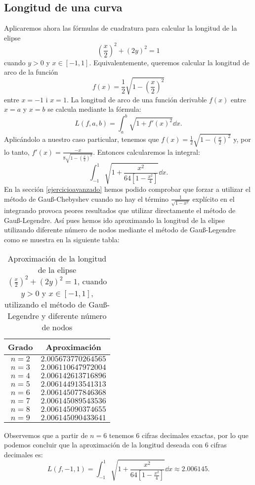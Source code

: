 \documentclass[a4paper]{article}
\begin{document}
\subsection*{Longitud de una curva}
Aplicaremos ahora las fórmulas de cuadratura para calcular la longitud de la elipse $$\left(\frac{x}{2}\right)^2+(2y)^2=1$$ cuando $y>0$ y $x\in[-1,1]$. Equivalentemente, queremos calcular la longitud de arco de la función $$f(x)=\frac{1}{2}\sqrt{1-\left(\frac{x}{2}\right)^2}$$ entre $x=-1$ i $x=1$. La longitud de arco de una función derivable $f(x)$ entre $x=a$ y $x=b$ se calcula mediante la fórmula: $$L(f,a,b)=\int_a^b\sqrt{1+f'(x)^2}\dd x.$$ Aplicándolo a nuestro caso particular, tenemos que $f(x)=\frac{1}{2}\sqrt{1-\left(\frac{x}{2}\right)^2}$ y, por lo tanto, $f'(x)=\frac{-x}{8\sqrt{1-\left(\frac{x}{2}\right)^2}}$. Entonces calcularemos la integral: $$\int_{-1}^1\sqrt{1+\frac{x^2}{64\left[1-\frac{x^2}{4}\right]}}\dd x.$$ En la sección \ref{ejercicioavanzado} hemos podido comprobar que forzar a utilizar el método de Gau\ss-Chebyshev cuando no hay el término $\frac{1}{\sqrt{1-x^2}}$ explícito en el integrando provoca peores resultados que utilizar directamente el método de Gau\ss-Legendre. Así pues hemos ido aproximando la longitud de la elipse utilizando diferente número de nodos mediante el método de Gau\ss-Legendre como se muestra en la siguiente tabla:
\begin{table}[ht]
    \centering
    \begin{tabular}{|c|c|}
        \hline
        Grado & Aproximación\\
        \hline
        $n=2$ & $2.005673770264565$ \\
        \hline
        $n=3$ & $2.006110647972004$ \\
        \hline
        $n=4$ & $2.006142613716896$ \\
        \hline
        $n=5$ & $2.006144913541313$ \\
        \hline
        $n=6$ & $2.006145077846368$ \\
        \hline
        $n=7$ & $2.006145089543536$ \\
        \hline
        $n=8$ & $2.006145090374655$ \\
        \hline
        $n=9$ & $2.006145090433641$ \\
        \hline
    \end{tabular}
    \caption{Aproximación de la longitud de la elipse $\left(\frac{x}{2}\right)^2+(2y)^2=1$, cuando $y>0$ y $x\in[-1,1]$, utilizando el método de Gau\ss-Legendre y diferente número de nodos}
\end{table}\par
Observemos que a partir de $n=6$ tenemos 6 cifras decimales exactas, por lo que podemos concluir que la aproximación de la longitud deseada con 6 cifras decimales es: $$L(f,-1,1)=\int_{-1}^1\sqrt{1+\frac{x^2}{64\left[1-\frac{x^2}{4}\right]}}\dd x\approx 2.006145.$$
\end{document}
